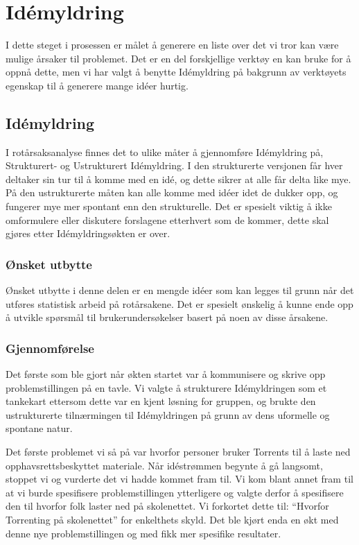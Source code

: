 \chapter{Idémyldring}
I dette steget i prosessen er målet å generere en liste over det vi tror kan være mulige årsaker til problemet. Det er en del forskjellige verktøy en kan bruke for å oppnå dette, men vi har valgt å benytte Idémyldring på bakgrunn av verktøyets egenskap til å generere mange idéer hurtig.

\section{Idémyldring}
I rotårsaksanalyse finnes det to ulike måter å gjennomføre Idémyldring på, Strukturert- og Ustrukturert Idémyldring. I den strukturerte versjonen får hver deltaker sin tur til å komme med en idé, og dette sikrer at alle får delta like mye. På den ustrukturerte måten kan alle komme med idéer idet de dukker opp, og fungerer mye mer spontant enn den strukturelle. Det er spesielt viktig å ikke omformulere eller diskutere forslagene etterhvert som de kommer, dette skal gjøres etter Idémyldringsøkten er over.

\subsection{Ønsket utbytte}
Ønsket utbytte i denne delen er en mengde idéer som kan legges til grunn når det utføres statistisk arbeid på rotårsakene. Det er spesielt ønskelig å kunne ende opp å utvikle spørsmål til brukerundersøkelser basert på noen av disse årsakene.

\subsection{Gjennomførelse}
Det første som ble gjort når økten startet var å kommunisere og skrive opp problemstillingen på en tavle. Vi valgte å strukturere Idémyldringen som et tankekart ettersom dette var en kjent løsning for gruppen, og brukte den ustrukturerte tilnærmingen til Idémyldringen på grunn av dens uformelle og spontane natur. 

Det første problemet vi så på var hvorfor personer bruker Torrents til å laste ned opphavsrettsbeskyttet materiale. Når idéstrømmen begynte å gå langsomt, stoppet vi og vurderte det vi hadde kommet fram til. Vi kom blant annet fram til at vi burde spesifisere problemstillingen ytterligere og valgte derfor å spesifisere den til hvorfor folk laster ned på skolenettet. Vi forkortet dette til: ``Hvorfor Torrenting på skolenettet'' for enkelthets skyld. Det ble kjørt enda en økt med denne nye problemstillingen og med fikk mer spesifike resultater. 

